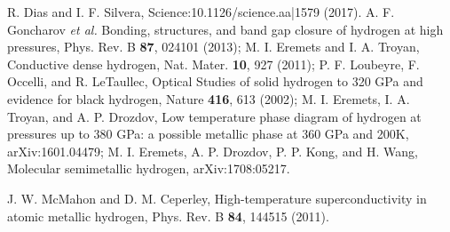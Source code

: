 \documentclass[aps,prb,twocolumn,groupedaddress]{revtex4}
\begin{document}
\begin{thebibliography}{99}
 R. Dias and I. F. Silvera, 
  Science:10.1126/science.aa|1579 (2017). 
 A. F. Goncharov {\it et al.} 
  Bonding, structures, and band gap closure of hydrogen at high pressures,
   Phys. Rev. B {\bf 87}, 024101 (2013);
  M. I. Eremets and I. A. Troyan, Conductive dense hydrogen,
   Nat. Mater. {\bf 10}, 927 (2011);
 P. F. Loubeyre, F. Occelli, and R. LeTaullec,
  Optical Studies of solid hydrogen to 320 GPa and evidence for
   black hydrogen, Nature {\bf 416}, 613 (2002);
  M. I. Eremets, I. A. Troyan, and A. P. Drozdov, 
   Low temperature phase diagram of hydrogen at pressures up to 380 GPa:
  a possible metallic phase at 360 GPa and 200K,
  arXiv:1601.04479;
 M. I. Eremets, A. P. Drozdov, P. P. Kong, and H. Wang,
  Molecular semimetallic hydrogen, arXiv:1708:05217.

 J. W. McMahon and D. M. Ceperley, 
  High-temperature superconductivity in atomic metallic hydrogen, 
  Phys. Rev. B {\bf 84}, 144515 (2011).



\end{thebibliography}
\end{document}
